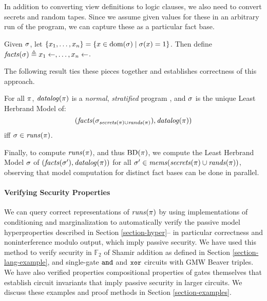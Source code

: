 In addition to converting view definitions to logic clauses, we also need to convert
secrets and random tapes. Since we assume given values for these in an arbitrary run of
the program, we can capture these as a particular fact base.
\begin{definition}
  Given $\sigma$, let $\{x_1,\ldots,x_n \} =
  \{ x \in \mathrm{dom}(\sigma) \mid \sigma(x) = 1 \}$.
  Then define $\mathit{facts}(\sigma) \triangleq x_1 \gets, \ldots, x_n \gets$.
\end{definition}
The following result ties these pieces together and establishes
correctness of this approach.
\begin{lemma}
  For all $\pi$, 
  $\mathit{datalog}(\pi)$ is a \emph{normal}, \emph{stratified}
  program \cite{aspis2018linear}, and $\sigma$ is the unique Least Herbrand
  Model of: $$(\mathit{facts}(\sigma_{\mathit{secrets}(\pi) \cup \mathit{rands}(\pi)}),\mathit{datalog}(\pi))$$
  iff $\sigma \in \mathit{runs}(\pi)$.
\end{lemma}
Finally, to compute $\mathit{runs}(\pi)$, and thus $\mathrm{BD}(\pi)$, we compute
the Least Herbrand Model $\sigma$ of $(\mathit{facts}(\sigma'),\mathit{datalog}(\pi))$
for all $\sigma' \in \mathit{mems}(\mathit{secrets}(\pi) \cup \mathit{rands}(\pi))$, observing
that model computation for distinct fact bases can be done in parallel. 

\paragraph{Verifying Security Properties} We can
query correct representations of $\mathit{runs}(\pi)$ by using
implementations of conditioning and marginalization to automatically
verify the passive model hyperproperties described in Section
\ref{section-hyper}-- in particular correctness and noninterference
modulo output, which imply passive security.  We have used this method
to verify security in $\mathbb{F}_2$ of Shamir addition as defined in Section
\ref{section-lang-example}, and single-gate $\texttt{and}$ and $\texttt{xor}$ circuits with GMW
Beaver triples. We have also
verified properties compositional properties of gates themselves that establish
circuit invariants that imply passive security in larger circuits.
We discuss these examples and proof methods in Section
\ref{section-examples}.


